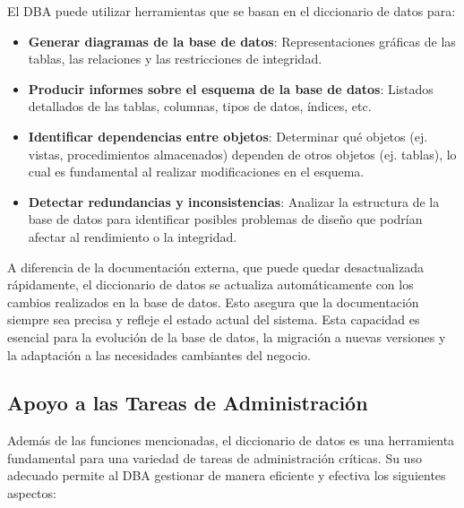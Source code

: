 El DBA puede utilizar herramientas que se basan en el diccionario de datos para:

\begin{itemize}
    \item \textbf{Generar diagramas de la base de datos}: Representaciones gráficas de las tablas, las relaciones y las restricciones de integridad.
    \item \textbf{Producir informes sobre el esquema de la base de datos}: Listados detallados de las tablas, columnas, tipos de datos, índices, etc.
    \item \textbf{Identificar dependencias entre objetos}: Determinar qué objetos (ej. vistas, procedimientos almacenados) dependen de otros objetos (ej. tablas), lo cual es fundamental al realizar modificaciones en el esquema.
    \item \textbf{Detectar redundancias y inconsistencias}: Analizar la estructura de la base de datos para identificar posibles problemas de diseño que podrían afectar al rendimiento o la integridad.
\end{itemize}

A diferencia de la documentación externa, que puede quedar desactualizada rápidamente, el diccionario de datos se actualiza automáticamente con los cambios realizados en la base de datos. Esto asegura que la documentación siempre sea precisa y refleje el estado actual del sistema. Esta capacidad es esencial para la evolución de la base de datos, la migración a nuevas versiones y la adaptación a las necesidades cambiantes del negocio.

\subsection{Apoyo a las Tareas de Administración}

Además de las funciones mencionadas, el diccionario de datos es una herramienta fundamental para una variedad de tareas de administración críticas.  Su uso adecuado permite al DBA gestionar de manera eficiente y efectiva los siguientes aspectos:

